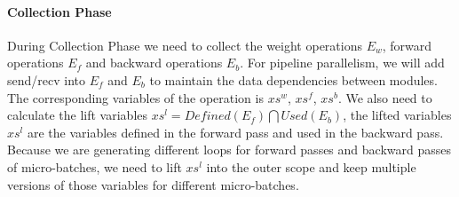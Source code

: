\documentclass[sigplan, nonacm]{acmart}\settopmatter{printfolios=true,printccs=false,printacmref=false}
\begin{document}
\paragraph{Collection Phase}
During Collection Phase we need to collect the weight operations $E_w$, forward operations $E_f$ and backward operations $E_b$. For pipeline parallelism, we will add send/recv into $E_f$ and $E_b$ to maintain the data dependencies between modules. The corresponding variables of the operation is $xs^w$, $xs^f$, $xs^b$. We also need to calculate the lift variables $xs^l = Defined(E_f) \bigcap Used(E_b)$, the lifted variables $xs^l$ are the variables defined in the forward pass and used in the backward pass. Because we are generating different loops for forward passes and backward passes of micro-batches, we need to lift $xs^l$ into the outer scope and keep multiple versions of those variables for different micro-batches.\par
\end{document}
